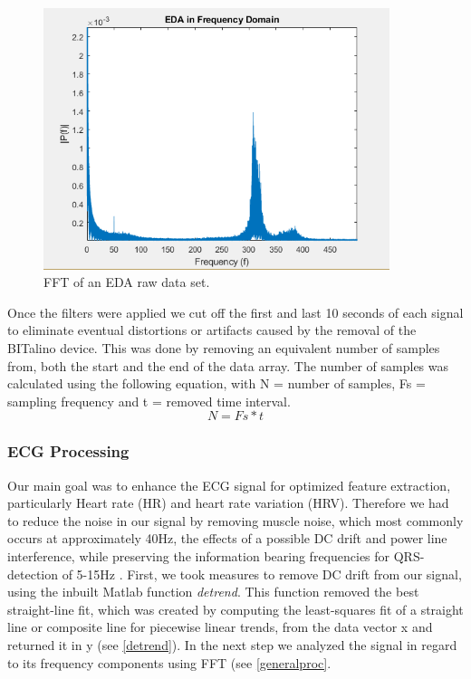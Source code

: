 \begin{figure}[ht]
\centering
\includegraphics[width=0.9\textwidth]{images/fftEDA.png}
\caption{FFT of an EDA raw data set.}
\label{fftEDAImg}
\end{figure}

Once the filters were applied we cut off the first and last 10 seconds of each signal to eliminate eventual distortions or artifacts caused by the removal of the BITalino device. This was done by removing an equivalent number of samples from, both the start and the end of the data array. The number of samples was calculated using the following equation, with N = number of samples, Fs = sampling frequency and t = removed time interval.
%
\begin{equation}\label{NumberSamples}
N = Fs * t
\end{equation} 

\subsubsection{ECG Processing}
Our main goal was to enhance the ECG signal for optimized feature extraction, particularly Heart rate (HR) and heart rate variation (HRV). %
Therefore we had to reduce the noise in our signal by removing muscle noise, which most commonly occurs at approximately 40Hz, the effects of a possible DC drift and power line interference, while preserving the information bearing frequencies for QRS-detection of 5-15Hz \cite{PANTOM1985} \cite{tan2013digital}. First, we took measures to remove DC drift from our signal, using the inbuilt Matlab function \textit{detrend}. This function removed the best straight-line fit, which was created by computing the least-squares fit of a straight line or composite line for piecewise linear trends, from the data vector x and returned it in y (see \ref{detrend}). In the next step we analyzed the signal in regard to its frequency components using FFT (see \ref{generalproc}.

